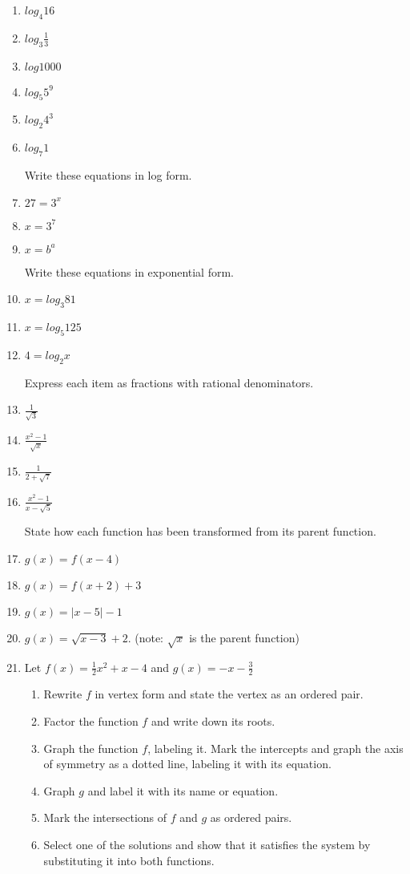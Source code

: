 \documentclass[]{book}
\begin{document}
\begin{enumerate}
\item $log_4 16$
\item $log_3 \frac{1}{3}$
\item $log 1000$
\item $log_5 5^9$
\item $log_2 4^3$
\item $log_7 1$

Write these equations in log form.
\item $27=3^x$
\item $x=3^7$
\item $x=b^a$

Write these equations in exponential form.
\item $x=log_3 81$
\item $x = log_5 125$
\item $4 = log_2 x$

Express each item as fractions with rational denominators.
\item $\displaystyle   \frac{1}{\sqrt{3}}$
\item $\displaystyle  \frac{x^2-1}{\sqrt{x}}$
\item $\displaystyle  \frac{1}{2+\sqrt{7}}$
\item $\displaystyle  \frac{x^2-1}{x-\sqrt{5}}$

State how each function has been transformed from its parent function.
\item $g(x)=f(x-4)$
\item $g(x)= f(x+2) + 3$
\item $g(x) = |x-5|-1$
\item $g(x) = \sqrt{x-3}+2$. (note: $\sqrt{x}$ is the parent function)

\newpage
\item Let $f(x) = \frac{1}{2}x^2+x-4$ and $g(x)=-x-\frac{3}{2}$
\begin{enumerate}
    \item Rewrite $f$ in vertex form and state the vertex as an ordered pair.
    \item Factor the function $f$ and write down its roots.
    \item Graph the function $f$, labeling it. Mark the intercepts and graph the axis of symmetry as a dotted line, labeling it with its equation.
    \item Graph $g$ and label it with its name or equation.
    \item Mark the intersections of $f$ and $g$ as ordered pairs.
    \item Select one of the solutions and show that it satisfies the system by substituting it into both functions.
\end{enumerate}



\end{enumerate}
\end{document}
